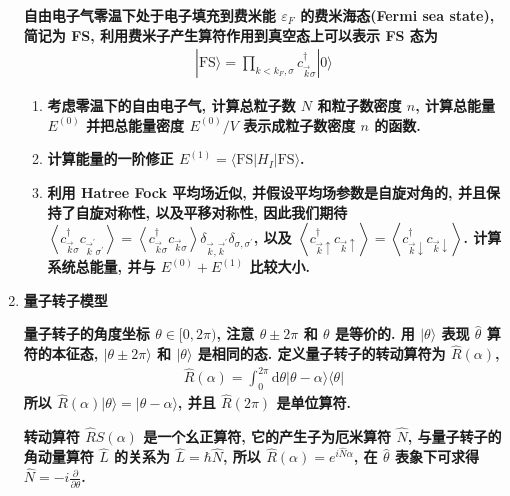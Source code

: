 \documentclass[../../main.tex]{subfiles}
\begin{document}
\begin{enumerate}
  \textbf{自由电子气零温下处于电子填充到费米能 $\varepsilon_{F}$ 的费米海态(Fermi sea state), 简记为 FS, 利用费米子产生算符作用到真空态上可以表示 FS 态为
  \begin{align*}
    |\text{FS}\rangle = \prod_{k < k_{F},\sigma}c_{\vec{k}\sigma}^{\dagger}|0\rangle
  \end{align*}}
  \begin{enumerate}
    \item \textbf{考虑零温下的自由电子气, 计算总粒子数 $N$ 和粒子数密度 $n$, 计算总能量 $E^{(0)}$ 并把总能量密度 $E^{(0)}/V$ 表示成粒子数密度 $n$ 的函数. }
    
    \item \textbf{计算能量的一阶修正 $E^{(1)} = \langle\text{FS}|H_{I}|\text{FS}\rangle$.}
    
    \item \textbf{利用 Hatree Fock 平均场近似, 并假设平均场参数是自旋对角的, 并且保持了自旋对称性, 以及平移对称性, 因此我们期待 $\left\langle c_{\vec{k}\sigma}^{\dagger}c_{\vec{k}^{\prime}\sigma^{\prime}}\right\rangle = \left\langle c_{\vec{k}\sigma}^{\dagger}c_{\vec{k}\sigma}\right\rangle\delta_{\vec{k},\vec{k}^{\prime}}\delta_{\sigma,\sigma^{\prime}}$, 以及 $\left\langle c_{\vec{k}\uparrow}^{\dagger}c_{\vec{k}\uparrow}\right\rangle = \left\langle c_{\vec{k}\downarrow}^{\dagger}c_{\vec{k}\downarrow}\right\rangle$. 计算系统总能量, 并与 $E^{(0)} + E^{(1)}$ 比较大小.}
  \end{enumerate}

  \item \textbf{量子转子模型}
  
  \textbf{量子转子的角度坐标 $\theta\in[0,2\pi)$, 注意 $\theta\pm 2\pi$ 和 $\theta$ 是等价的. 用 $|\theta\rangle$ 表现 $\hat{\theta}$ 算符的本征态, $|\theta\pm 2\pi\rangle$ 和 $|\theta\rangle$ 是相同的态. 定义量子转子的转动算符为 $\hat{R}(\alpha)$, 
  \begin{align*}
    \hat{R}(\alpha) = \int_{0}^{2\pi}\mathrm{d}\theta |\theta - \alpha\rangle\langle\theta|
  \end{align*}
  所以 $\hat{R}(\alpha)|\theta\rangle = |\theta - \alpha\rangle$, 并且 $\hat{R}(2\pi)$ 是单位算符.}

  \textbf{转动算符 $\hat{R}S(\alpha)$ 是一个幺正算符, 它的产生子为厄米算符 $\hat{N}$, 与量子转子的角动量算符 $\hat{L}$ 的关系为 $\hat{L} = \hbar\hat{N}$, 所以 $\hat{R}(\alpha) = e^{i\hat{N}\alpha}$, 在 $\hat{\theta}$ 表象下可求得 $\hat{N} = -i\frac{\partial}{\partial\theta}$. }


\end{enumerate}
\end{document}
